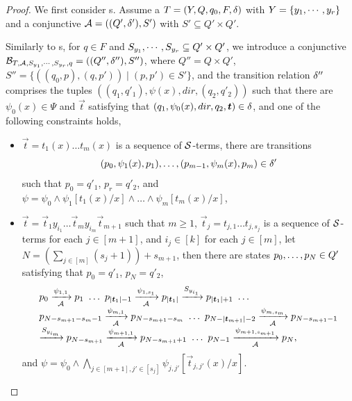 \begin{proof}

We first consider \SSPT{}s. Assume a \SSPT{} $T=(Y, Q, q_0, F, \delta)$ with $Y = \{y_1,\cdots, y_r\}$ and a conjunctive \SA{} $\mathcal{A} = ((Q', \delta'), S')$ with $S' \subseteq Q' \times Q'$. 

Similarly to \FFA{}s, for $q \in F$ and  $S_{y_1}, \cdots, S_{y_r} \subseteq Q' \times Q'$, we  introduce a conjunctive \SSA{} $\mathcal{B}_{T, \mathcal{A}, S_{y_1}, \cdots, S_{y_r}, q} = ((Q'', \delta''), S'')$, where $Q'' = Q \times Q'$, $S'' = \{((q_0, p), (q, p')) \mid (p, p') \in S'\}$, and the transition relation $\delta''$ comprises the tuples 
$((q_1, q'_1), \psi(x), dir, (q_2, q'_2))$ such that there are $\psi_0(x) \in \Psi$ and $\vec{t}$ satisfying that $(q_1, \psi_0(x), dir, q_2, \vec{t}) \in \transrel$, and one of the following constraints holds, 
\begin{itemize}
\item $\vec{t} = t_1(x) \ldots t_m(x)$ is a sequence of $\mathcal{S}$-terms, there are transitions 
$$(p_{0}, \psi_1(x), p_{1}), \ldots, (p_{m-1}, \psi_m(x), p_m) \in \delta'$$ 
such that $p_0 = q'_1$, $p_r = q'_2$, and $\psi = \psi_0 \wedge \psi_1[t_1(x)/x] \wedge \ldots \wedge \psi_m[t_m(x)/x]$,
%
\item $\vec{t} = \vec{t}_1 y_{i_1} \ldots \vec{t}_{m} y_{i_{m}} \vec{t}_{m+1}$ such that $m \ge 1$, $\vec{t}_j = t_{j, 1} \ldots t_{j, s_j}$ is a sequence of $\mathcal{S}$-terms for each $j \in [m+1]$,  and $i_j \in [k]$ for each $j \in [m]$, let $N = (\sum \limits_{j \in [m]} (s_j+ 1)) +s_{m+1}$, then there are states $p_0, \ldots, p_{N} \in Q'$ satisfying that $p_0 = q'_1$, $p_{N} = q'_2$,  
%
$$
\begin{array}{l}
p_0 \xrightarrow[\Aut]{\psi_{1,1}} p_1\ \ldots\ p_{|\vec{t}_1|-1} \xrightarrow[\Aut]{\psi_{1, s_1}} p_{|\vec{t}_1|} \xrightarrow{S_{y_{i_1}}} p_{|\vec{t}_1|+1}\ \ldots\\
p_{N - s_{m+1} - s_m -1} \xrightarrow[\Aut]{\psi_{m, 1}} p_{N - s_{m+1} - s_m } \ \ldots\ p_{N - |\vec{t}_{m+1}| - 2} \xrightarrow[\Aut]{\psi_{m, s_m}} p_{N-s_{m+1}-1}\\
 \xrightarrow{S_{y_{i_m}}} p_{N- s_{m+1}} \xrightarrow[\Aut]{\psi_{m+1, 1}} p_{N -s_{m+1}+1}\ \ldots\ p_{N - 1} \xrightarrow[\Aut]{\psi_{m+1,  s_{m+1}} } p_{N},
\end{array}
 $$ 
 and $\psi = \psi_0 \wedge \bigwedge \limits_{j \in [m+1], j' \in [s_j]} \psi_{j, j'} [\vec{t}_{j, j'}(x)/x].$
\end{itemize}

\end{proof}
